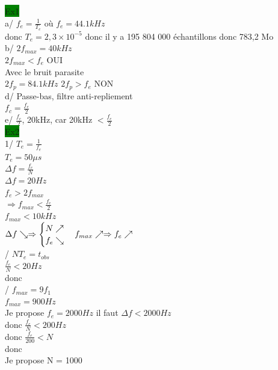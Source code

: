 \documentclass[a4paper,twocolumn,landscape]{article}
\begin{document}
\noindent \colorbox{green}{Ex1}\\
a/ \(f_e = \frac{1}{T_e}\) où \(f_e = 44.1kHz\)\\
donc \(T_e = 2,3 \times 10^{-5}\)
donc il y a 195 804 000 échantillons
donc 783,2 Mo\\

\noindent
b/ \(2f_{max} = 40 kHz\)\\
\(2f_{max} < f_e\) OUI\\
Avec le bruit parasite\\
\(2f_p = 84.1 kHz\)
\(2f_p > f_e\) NON\\

\noindent 
d/ Passe-bas, filtre anti-repliement \\
\(f_c = \frac{f_e}{2}\)\\

\noindent
e/ \(\frac{f_e}{2}\), 20kHz, car 20kHz \(< \frac{f_e}{2}\)\\

\noindent \colorbox{green}{Ex2}\\
1/
\(T_e = \frac{1}{f_e}\)\\
\(T_e = 50 \mu s\)\\
\(\Delta f = \frac{f_e}{N}\)\\
\(\Delta f = 20Hz\)\\
\(f_e > 2f_{max}\)\\
\(\Rightarrow f_{max} < \frac{f_e}{2}\)\\
\(f_{max} < 10kHz\)\\

\(\Delta f \searrow \Rightarrow \begin{cases}
    N \nearrow\\
    f_e \searrow
\end{cases}\\
f_{max} \nearrow \Rightarrow f_e \nearrow \)\\

/ \(NT_e = t_{obs}\)\\
\(\frac{f_e}{N}<20Hz\)\\
donc \\

/ \(f_{max} = 9f_1\)\\
\(f_{max} = 900 Hz\)\\
Je propose \(f_e = 2000Hz\)
il faut \(\Delta f < 2000Hz\)\\
donc \(\frac{f_e}{N}<200Hz\)\\
donc \(\frac{f_e}{200}< N\)\\
donc \\
Je propose N = 1000\\
\end{document}
